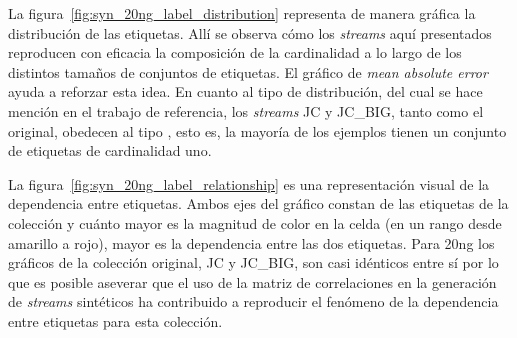 La figura~\ref{fig:syn_20ng_label_distribution} representa de manera gráfica la
distribución de las etiquetas. Allí se observa cómo los \textit{streams} aquí
presentados reproducen con eficacia la composición de la cardinalidad a lo largo
de los distintos tamaños de conjuntos de etiquetas. El gráfico de \textit{mean
	absolute error} ayuda a reforzar esta idea. En cuanto al tipo de distribución,
del cual se hace mención en el trabajo de referencia, los \textit{streams} JC y
JC\_BIG, tanto como el original, obedecen al tipo , esto es, la
mayoría de los ejemplos tienen un conjunto de etiquetas de cardinalidad uno.

\clearpage

La figura~\ref{fig:syn_20ng_label_relationship} es una representación visual de
la dependencia entre etiquetas. Ambos ejes del gráfico constan de las etiquetas
de la colección y cuánto mayor es la magnitud de color en la celda (en un rango
desde amarillo a rojo), mayor es la dependencia entre las dos etiquetas. Para
20ng los gráficos de la colección original, JC y JC\_BIG, son casi idénticos
entre sí por lo que es posible aseverar que el uso de la matriz de correlaciones
en la generación de \textit{streams} sintéticos ha contribuido a reproducir el
fenómeno de la dependencia entre etiquetas para esta colección.

